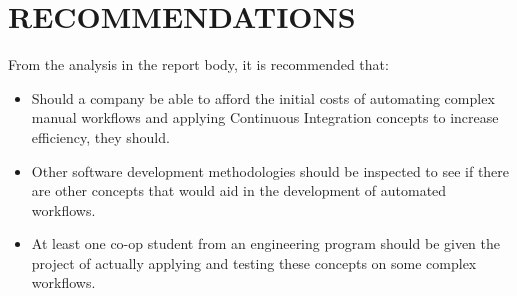 \section{RECOMMENDATIONS} %
\label{sec:recommendations}
From the analysis in the report body, it is recommended that:\\

\begin{itemize}
	\item Should a company be able to afford the initial costs of automating complex manual workflows and applying Continuous Integration concepts to increase efficiency, they should.
	
	\item Other software development methodologies should be inspected to see if there are other concepts that would aid in the development of automated workflows.
	
	\item At least one co-op student from an engineering program should be given the project of actually applying and testing these concepts on some complex workflows.
\end{itemize}
